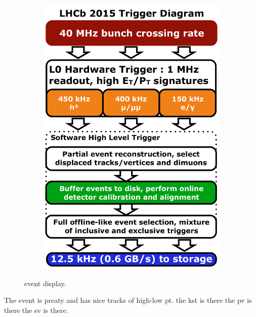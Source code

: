 \begin{figure}[t]
\begin{subfigure}{0.5\textwidth}
    \includegraphics[width=\textwidth]{Figures/Chapter2/LHCb_Trigger_RunII_May2015}
    \caption{}
  \end{subfigure}
  \caption{\BsJpsiKst event display.}
  \label{det_evt_display}
\end{figure}

The event is preaty and has nice tracks of high-low pt. the kst is there the pv is there the sv is there.

